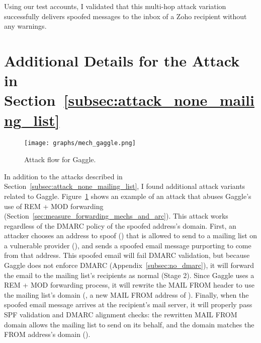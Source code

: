 Using our test accounts, I validated that this multi-hop attack variation
successfully delivers spoofed messages to the inbox of a Zoho recipient
without any warnings.






\section{Additional Details for the Attack in Section~\ref{subsec:attack_none_mailing_list}}
\label{sec:append_mailing_list_details}


\begin{figure}[t]
\centering
\texttt{[image: graphs/mech\_gaggle.png]}
\centering
\caption{Attack flow for Gaggle.}
\label{fig:gaggle_email_mech}
\end{figure}

In addition to the attacks described in
Section~\ref{subsec:attack_none_mailing_list}, I found
additional attack variants related to Gaggle.
Figure~\ref{fig:gaggle_email_mech} shows an example of an attack that
abuses Gaggle's use of REM + MOD forwarding
(Section~\ref{sec:measure_forwarding_mechs_and_arc}). This attack works
regardless of the DMARC policy of the spoofed address's domain.  First, an
attacker chooses an address to spoof () that is
allowed to send to a mailing list on a vulnerable provider
(), and sends a spoofed email message
purporting to come from that address.  This spoofed email will fail
DMARC validation, but because Gaggle does not enforce DMARC
(Appendix~\ref{subsec:no_dmarc}), it will forward the email to the
mailing list's recipients as normal (Stage 2).  Since Gaggle uses a
REM + MOD forwarding process, it will rewrite the \textsc{MAIL FROM}
header to use the mailing list's domain (\eg, a
new \textsc{MAIL FROM} address of ).
Finally, when the spoofed email message arrives at the recipient's mail server,
it will properly pass SPF validation and DMARC alignment checks:
the rewritten \textsc{MAIL FROM} domain allows the mailing list to send on its behalf, and the domain matches the \textsc{FROM} address's domain ().

